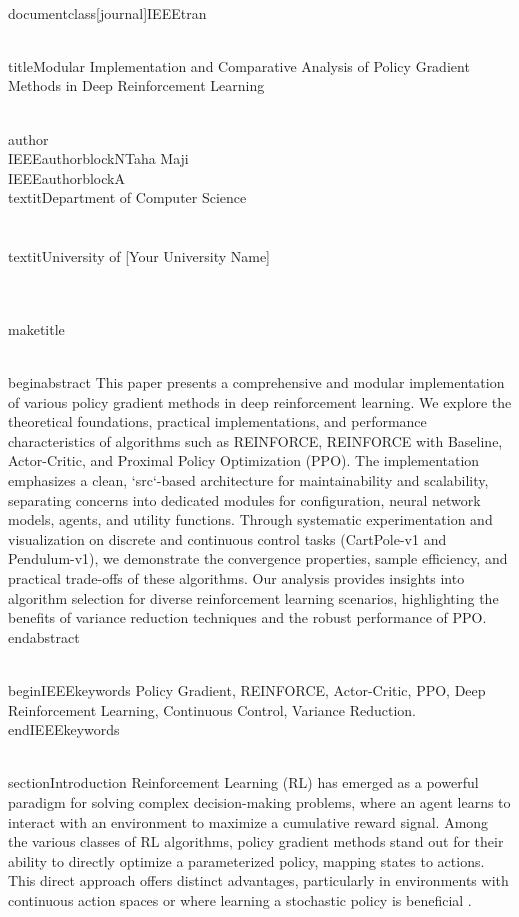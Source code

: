 \\documentclass[journal]{IEEEtran}
\begin{document}
\\title{Modular Implementation and Comparative Analysis of Policy Gradient Methods in Deep Reinforcement Learning}

\\author{
\\IEEEauthorblockN{Taha Maji}
\\IEEEauthorblockA{\\textit{Department of Computer Science} \\\\
\\textit{University of [Your University Name]} \\\\
[Your Email Address]}
}

\\maketitle

\\begin{abstract}
This paper presents a comprehensive and modular implementation of various policy gradient methods in deep reinforcement learning. We explore the theoretical foundations, practical implementations, and performance characteristics of algorithms such as REINFORCE, REINFORCE with Baseline, Actor-Critic, and Proximal Policy Optimization (PPO). The implementation emphasizes a clean, `src`-based architecture for maintainability and scalability, separating concerns into dedicated modules for configuration, neural network models, agents, and utility functions. Through systematic experimentation and visualization on discrete and continuous control tasks (CartPole-v1 and Pendulum-v1), we demonstrate the convergence properties, sample efficiency, and practical trade-offs of these algorithms. Our analysis provides insights into algorithm selection for diverse reinforcement learning scenarios, highlighting the benefits of variance reduction techniques and the robust performance of PPO.
\\end{abstract}

\\begin{IEEEkeywords}
Policy Gradient, REINFORCE, Actor-Critic, PPO, Deep Reinforcement Learning, Continuous Control, Variance Reduction.
\\end{IEEEkeywords}

\\section{Introduction}
Reinforcement Learning (RL) has emerged as a powerful paradigm for solving complex decision-making problems, where an agent learns to interact with an environment to maximize a cumulative reward signal. Among the various classes of RL algorithms, policy gradient methods stand out for their ability to directly optimize a parameterized policy, mapping states to actions. This direct approach offers distinct advantages, particularly in environments with continuous action spaces or where learning a stochastic policy is beneficial \cite{sutton2018reinforcement}.
\end{document}
